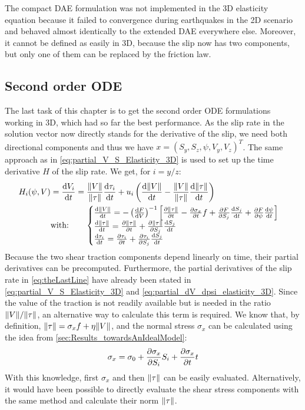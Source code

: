 The compact DAE formulation was not implemented in the 3D elasticity equation because it failed to convergence during earthquakes in the 2D scenario and behaved almost identically to the extended DAE everywhere else. Moreover, it cannot be defined as easily in 3D, because the slip now has two components, but only one of them can be replaced by the friction law. 

\subsection{Second order ODE}
The last task of this chapter is to get the second order ODE formulations working in 3D, which had so far the best performance. As the slip rate in the solution vector now directly stands for the derivative of the slip, we need both directional components and thus we have $x = (S_y, S_z, \psi, V_y, V_z)^T$. The same approach as in \autoref{eq:partial_V_S_Elasticity_3D} is used to set up the time derivative $H$ of the slip rate. We get, for $i=y/z$:
\begin{align}
	H_i(\psi,V) &= \dv{V_i}{t} = \frac{\norm{V}}{\norm{\tau}}\dv{\tau_i}{t} + u_i\left(\dv{\norm{V}}{t} - \frac{\norm{V}}{\norm{\tau}}\dv{\norm{\tau}}{t}\right) \nonumber \\
	\label{eq:theLastLine}
	&\text{with:}\qquad\begin{cases}
		\dv{\norm{V}}{t} = -\left(\dv{F}{V}\right)^{-1}\left[\pdv{\norm{\tau}}{t} - \pdv{\sigma_x}{t}f + \pdv{F}{S_j}\dv{S_j}{t} + \pdv{F}{\psi}\dv{\psi}{t} \right] \\
		\dv{\norm{\tau}}{t} = \pdv{\norm{\tau}}{t} + \pdv{\norm{\tau}}{S_j}\dv{S_j}{t} \\
		\dv{\tau_i}{t} = \pdv{\tau_i}{t} + \pdv{\tau_i}{S_j}\dv{S_j}{t}
	\end{cases}
\end{align}
Because the two shear traction components depend linearly on time, their partial derivatives can be precomputed. Furthermore, the partial derivatives of the slip rate in \autoref{eq:theLastLine} have already been stated in \autoref{eq:partial_V_S_Elasticity_3D} and \autoref{eq:partial_dV_dpsi_elasticity_3D}. Since the value of the traction is not readily available but is needed in the ratio $\norm{V}/\norm{\tau}$, an alternative way to calculate this term is required. We know that, by definition, $\norm{\tau} = \sigma_x f + \eta\norm{V}$, and the normal stress $\sigma_x$ can be calculated using the idea from \autoref{sec:Results_towardsAnIdealModel}:
\begin{equation}
	\sigma_x = \sigma_0 + \pdv{\sigma_x}{S_i}S_i + \pdv{\sigma_x}{t}t
\end{equation} 
With this knowledge, first $\sigma_x$ and then $\norm{\tau}$ can be easily evaluated. Alternatively, it would have been possible to directly evaluate the shear stress components with the same method and calculate their norm $\norm{\tau}$. 

